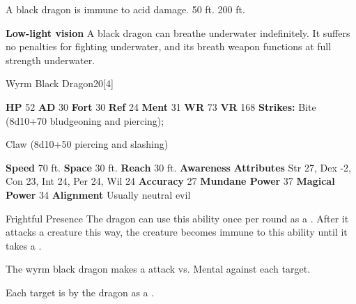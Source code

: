       
       A black dragon is immune to acid damage.
     50 ft.
     200 ft.
    \par\noindent\textbf{Low-light vision}
        A black dragon can breathe underwater indefinitely.
        It suffers no penalties for fighting underwater, and its breath weapon functions at full strength underwater.
  

  \begin{monsubsection}{Wyrm Black Dragon}{20}[4]
    \vspace{-1em}\vspace{-1em}
    \vspace{0em}

    
    

    \begin{spellcontent}
      \begin{spelltargetinginfo}
        \pari \textbf{HP} 52 \monsep
          \textbf{AD} 30 \monsep
          \textbf{Fort} 30 \monsep
          \textbf{Ref} 24 \monsep
          \textbf{Ment} 31
        \pari \textbf{WR} 73 \monsep
        \textbf{VR} 168
        \pari \textbf{Strikes:}
            Bite  (8d10+70 bludgeoning and piercing);
\par Claw  (8d10+50 piercing and slashing)
      \end{spelltargetinginfo}
    \end{spellcontent}
    \begin{monsterfooter}
      \pari \textbf{Speed} 70 ft. \monsep
        \textbf{Space} 30 ft. \monsep
        \textbf{Reach} 30 ft.
      \pari \textbf{Awareness} 
      \pari \textbf{Attributes}
        Str 27, Dex -2,
        Con 23, Int 24,
        Per 24, Wil 24
      \pari \textbf{Accuracy} 27 \monsep
        \textbf{Mundane Power} 37 \monsep
      \textbf{Magical Power} 34
      \pari \textbf{Alignment} Usually neutral evil
    \end{monsterfooter}
  \end{monsubsection}
  \begin{freeability}{Frightful Presence}
      The dragon can use this ability once per round as a .
      After it attacks a creature this way, the creature becomes immune to this ability until it takes a .
      \par The wyrm black dragon makes a  attack
        vs. Mental against each target.
    
    \hit Each target is  by the dragon as a .
    \end{freeability}
  

